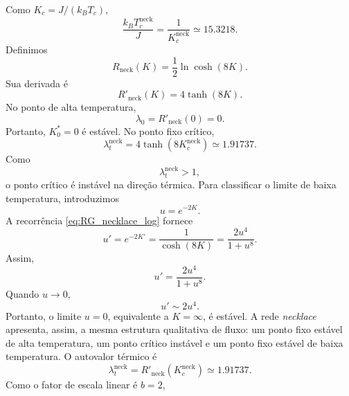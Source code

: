 \documentclass[12pt,a4paper]{article}
\begin{document}
%
Como $K_c=J/(k_BT_c)$,
%
\begin{equation}
    \frac{k_BT_c^{\mathrm{neck}}}{J}
    =
    \frac{1}{K_c^{\mathrm{neck}}}
    \simeq15.3218.
    \label{eq:Tc_necklace}
\end{equation}
%
Definimos
%
\begin{equation}
    R_{\mathrm{neck}}(K)
    =
    \frac12\ln\cosh(8K).
\end{equation}
%
Sua derivada é
%
\begin{equation}
    R'_{\mathrm{neck}}(K)
    =
    4\tanh(8K).
    \label{eq:Rprime_necklace}
\end{equation}
%
No ponto de alta temperatura,
%
\begin{equation}
    \lambda_0
    =
    R'_{\mathrm{neck}}(0)
    =
    0.
\end{equation}
%
Portanto, $K_0^*=0$ é estável. No ponto fixo crítico,
%
\begin{equation}
    \lambda_t^{\mathrm{neck}}
    =
    4\tanh(8K_c^{\mathrm{neck}})
    \simeq1.91737.
\end{equation}
%
Como
%
\begin{equation}
    \lambda_t^{\mathrm{neck}}>1,
\end{equation}
%
o ponto crítico é instável na direção térmica. Para classificar o limite de baixa temperatura, introduzimos
%
\begin{equation}
    u=e^{-2K}.
\end{equation}
%
A recorrência \eqref{eq:RG_necklace_log} fornece
%
\begin{equation}
    u'
    =
    e^{-2K'}
    =
    \frac{1}{\cosh(8K)}
    =
    \frac{2u^4}{1+u^8}.
\end{equation}
%
Assim,
%
\begin{equation}
    u'=\frac{2u^4}{1+u^8}.
\end{equation}
%
Quando $u\to0$,
%
\begin{equation}
    u'\sim2u^4.
\end{equation}
%
Portanto, o limite $u=0$, equivalente a $K=\infty$, é estável. A rede \textit{necklace} apresenta, assim, a mesma estrutura
qualitativa de fluxo: um ponto fixo estável de alta temperatura,
um ponto crítico instável e um ponto fixo estável de baixa
temperatura. O autovalor térmico é
%
\begin{equation}
    \lambda_t^{\mathrm{neck}}
    =
    R'_{\mathrm{neck}}(K_c^{\mathrm{neck}})
    \simeq1.91737.
\end{equation}
%
Como o fator de escala linear é $b=2$,
%
\end{document}
